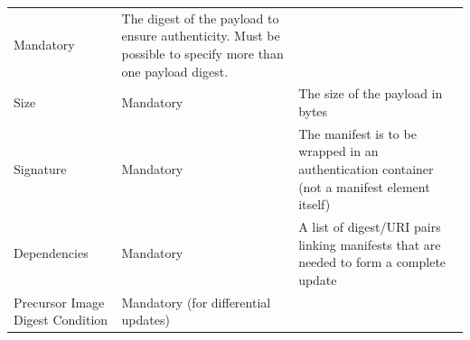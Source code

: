 \documentclass[0-thesis.tex]{subfiles}
\begin{document}
\begin{small}
\begin{longtable}[]{@{}lll@{}}
\begin{minipage}[t]{0.26\columnwidth}
    Mandatory\strut
    \end{minipage} & \begin{minipage}[t]{0.42\columnwidth}\raggedright\strut
    The digest of the payload to ensure authenticity. Must be possible to
    specify more than one payload digest.\strut
    \end{minipage}\tabularnewline
    \begin{minipage}[t]{0.23\columnwidth}\raggedright\strut
    Size\strut
    \end{minipage} & \begin{minipage}[t]{0.26\columnwidth}\raggedright\strut
    Mandatory\strut
    \end{minipage} & \begin{minipage}[t]{0.42\columnwidth}\raggedright\strut
    The size of the payload in bytes\strut
    \end{minipage}\tabularnewline
    \begin{minipage}[t]{0.23\columnwidth}\raggedright\strut
    Signature\strut
    \end{minipage} & \begin{minipage}[t]{0.26\columnwidth}\raggedright\strut
    Mandatory\strut
    \end{minipage} & \begin{minipage}[t]{0.42\columnwidth}\raggedright\strut
    The manifest is to be wrapped in an authentication container (not a
    manifest element itself)\strut
    \end{minipage}\tabularnewline
    \begin{minipage}[t]{0.23\columnwidth}\raggedright\strut
    Dependencies\strut
    \end{minipage} & \begin{minipage}[t]{0.26\columnwidth}\raggedright\strut
    Mandatory\strut
    \end{minipage} & \begin{minipage}[t]{0.42\columnwidth}\raggedright\strut
    A list of digest/URI pairs linking manifests that are needed to form a
    complete update\strut
    \end{minipage}\tabularnewline
    \begin{minipage}[t]{0.23\columnwidth}\raggedright\strut
    Precursor Image Digest Condition\strut
    \end{minipage} & \begin{minipage}[t]{0.26\columnwidth}\raggedright\strut
    Mandatory (for differential updates)\strut
    \end{minipage} & \begin{minipage}[t]{0.42\columnwidth}\raggedright\strut

\end{minipage}
\end{longtable}
\end{small}
\end{document}
